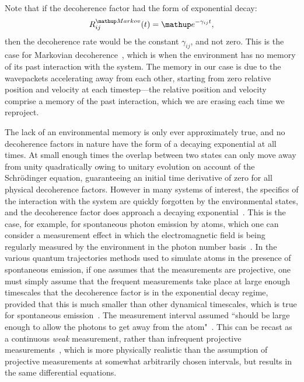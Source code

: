 Note that if the decoherence factor had the form of exponential decay:
\begin{align}
R^\up{Markov}_{ij}(t) = \ee^{-\gamma_{ij} t}, 
\end{align}
then the decoherence rate would be the constant $\gamma_{ij}$, and not zero. This is the case for Markovian decoherence~\cite{schlosshauer_decoherence:_2007}, which is when the environment has no memory of its past interaction with the system. The memory in our case is due to the wavepackets accelerating away from each other, starting from zero relative position and velocity at each timestep---the relative position and velocity comprise a memory of the past interaction, which we are erasing each time we reproject.

The lack of an environmental memory is only ever approximately true, and no decoherence factors in nature have the form of a decaying exponential at all times. At small enough times the overlap between two states can only move away from unity quadratically owing to unitary evolution on account of the Schr\"odinger equation, guaranteeing an initial time derivative of zero for all physical decoherence factors. However in many systems of interest, the specifics of the interaction with the system are quickly forgotten by the environmental states, and the decoherence factor does approach a decaying exponential~\cite{0034-4885-41-4-003}. This is the case, for example, for spontaneous photon emission by atoms, which one can consider a measurement effect in which the electromagnetic field is being regularly measured by the environment in the photon number basis~\cite{1355-5111-8-1-015, Molmer:93, RevModPhys.70.101}. In the various quantum trajectories methods used to simulate atoms in the presence of spontaneous emission, if one assumes that the measurements are projective, one must simply assume that the frequent measurements take place at large enough timescales that the decoherence factor is in the exponential decay regime, provided that this is much smaller than other dynamical timescales, which is true for spontaneous emission~\cite{RevModPhys.70.101}. The measurement interval assumed ``should be large enough to allow the photons to get away from the atom"~\cite{2003LNP...622..233H}. This can be recast as a continuous \emph{weak} measurement, rather than infrequent projective measurements~\cite{doi:10.1080/00107510601101934, RevModPhys.70.101}, which is more physically realistic than the assumption of projective measurements at somewhat arbitrarily chosen intervals, but results in the same differential equations.

